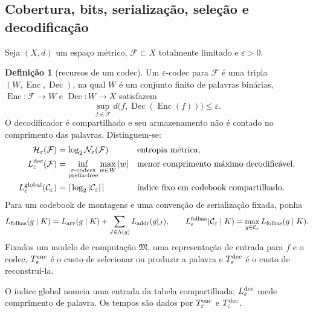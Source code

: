 \documentclass[11pt,a4paper]{article}
\theoremstyle{preciso}
\theoremstyle{definition}
\newtheorem{definicao}[teorema]{Definição}
\newcommand{\FF}{\mathcal F}
\newcommand{\CC}{\mathcal C}
\begin{document}
\subsection{Cobertura, bits, serialização, seleção e decodificação}
Seja $(X,d)$ um espaço métrico, $\FF\subset X$ totalmente limitado e $\varepsilon>0$.
\begin{definicao}[recursos de um codec]
Um $\varepsilon$-codec para $\FF$ é uma tripla $(W,\operatorname{Enc},\operatorname{Dec})$, na qual $W$ é um conjunto finito de palavras binárias, $\operatorname{Enc}:\FF\to W$ e $\operatorname{Dec}:W\to X$ satisfazem
\[
\sup_{f\in\FF}d\bigl(f,\operatorname{Dec}(\operatorname{Enc}(f))\bigr)\le\varepsilon.
\]
O decodificador é compartilhado e seu armazenamento não é contado no comprimento das palavras. Distinguem-se:
\begin{align*}
\mathcal H_\varepsilon(\FF)&=\log_2\mathcal N_\varepsilon(\FF)
&&\text{entropia métrica},\\
L_\varepsilon^{\rm dec}(\FF)&=
\inf_{\substack{\varepsilon\text{-codecs}\\\text{prefix-free}}}\max_{w\in W}|w|
&&\text{menor comprimento máximo decodificável},\\
L_\varepsilon^{\rm global}(\CC_\varepsilon)&=\lceil\log_2|\CC_\varepsilon|\rceil
&&\text{índice fixo em codebook compartilhado}.
\end{align*}
Para um codebook de montagens e uma convenção de serialização fixada, ponha
\[
L_{\rm folhas}(g\mid K)=L_{\rm arv}(g\mid K)+
\sum_{J\in\Lambda(g)}L_{\rm addr}(g|_J),
\qquad
L_\varepsilon^{\rm folhas}(\CC_\varepsilon\mid K)=
\max_{g\in\CC_\varepsilon}L_{\rm folhas}(g\mid K).
\]
Fixados um modelo de computação $\mathfrak M$, uma representação de entrada para $f$ e o codec, $T_\varepsilon^{\rm enc}$ é o custo de selecionar ou produzir a palavra e $T_\varepsilon^{\rm dec}$ é o custo de reconstruí-la.
\end{definicao}
O índice global nomeia uma entrada da tabela compartilhada; $L_\varepsilon^{\rm dec}$ mede comprimento de palavra. Os tempos são dados por $T_\varepsilon^{\rm enc}$ e $T_\varepsilon^{\rm dec}$.
\end{document}
